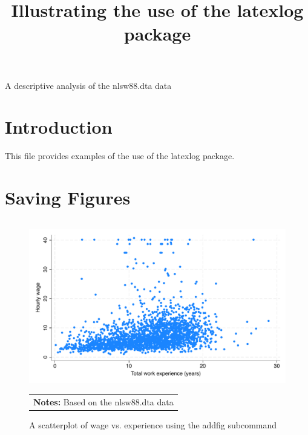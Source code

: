 \documentclass{article}
\begin{document}
\title{Illustrating the use of the latexlog package}
\maketitle
A descriptive analysis of the nlsw88.dta data
\section{Introduction}
This file provides examples of the use of the latexlog package.
\section{Saving Figures}
\begin{figure}[H] 
\centering 
\begin{tabular}{p{6in}}
\caption{A scatterplot of wage vs. experience using the addfig subcommand} 
\end{tabular}
\includegraphics[width = .8\textwidth]{./figures/scatter_wage.pdf} \\ 
\begin{tabular}{p{6in}}  
\footnotesize \vspace{2pt} 
  \textbf{Notes:} Based on the nlsw88.dta data 
\end{tabular} 
\end{figure} 
\end{document}
